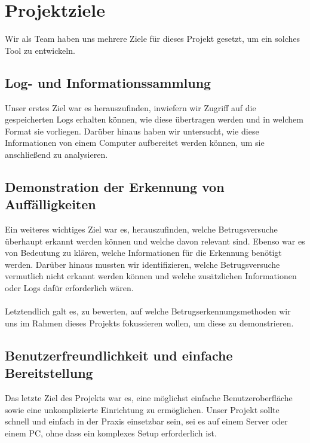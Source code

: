 \chapter{Projektziele} \label{ch:projektziele}
Wir als Team haben uns mehrere Ziele für dieses Projekt gesetzt, um ein solches Tool zu entwickeln.

\section{Log- und Informationssammlung}
Unser erstes Ziel war es herauszufinden, inwiefern wir Zugriff auf die gespeicherten Logs erhalten können, wie diese übertragen werden und in welchem Format sie vorliegen. 
Darüber hinaus haben wir untersucht, wie diese Informationen von einem Computer aufbereitet werden können, um sie anschließend zu analysieren.

\section{Demonstration der Erkennung von Auffälligkeiten}
Ein weiteres wichtiges Ziel war es, herauszufinden, welche Betrugsversuche überhaupt erkannt werden können und welche davon relevant sind. 
Ebenso war es von Bedeutung zu klären, welche Informationen für die Erkennung benötigt werden. 
Darüber hinaus mussten wir identifizieren, welche Betrugsversuche vermutlich nicht erkannt werden können und welche zusätzlichen Informationen oder Logs dafür erforderlich wären.\\
\\
Letztendlich galt es, zu bewerten, auf welche Betrugserkennungsmethoden wir uns im Rahmen dieses Projekts fokussieren wollen, um diese zu demonstrieren.

\section{Benutzerfreundlichkeit und einfache Bereitstellung}
Das letzte Ziel des Projekts war es, eine möglichst einfache Benutzeroberfläche sowie eine unkomplizierte Einrichtung zu ermöglichen. 
Unser Projekt sollte schnell und einfach in der Praxis einsetzbar sein, sei es auf einem Server oder einem PC, ohne dass ein komplexes Setup erforderlich ist.
